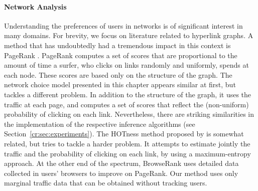 \paragraph{Network Analysis}
Understanding the preferences of users in networks is of significant interest in many domains.
For brevity, we focus on literature related to hyperlink graphs.
A method that has undoubtedly had a tremendous impact in this context is PageRank \citep{brin1998anatomy}.
PageRank computes a set of scores that are proportional to the amount of time a surfer, who clicks on links randomly and uniformly, spends at each node.
These scores are based only on the structure of the graph.
The network choice model presented in this chapter appears similar at first, but tackles a different problem.
In addition to the structure of the graph, it uses the traffic at each page, and computes a set of scores that reflect the (non-uniform) probability of clicking on each link.
Nevertheless, there are striking similarities in the implementation of the respective inference algorithms (see Section~\ref{cr:sec:experiments}).
The HOTness method proposed by \citet{tomlin2003new} is somewhat related, but tries to tackle a harder problem.
It attempts to estimate jointly the traffic and the probability of clicking on each link, by using a maximum-entropy approach.
At the other end of the spectrum, BrowseRank \citep{liu2008browserank} uses detailed data collected in users' browsers to improve on PageRank.
Our method uses only marginal traffic data that can be obtained without tracking users.
